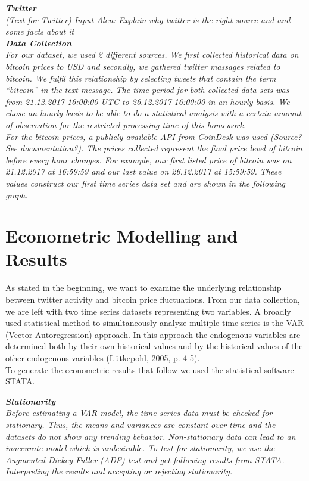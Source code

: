 \documentclass[a4paper,american,12pt]{article}
\begin{document}
\begin{spacing}{1.2}
		\itshape\textbf {Twitter}\\
		\textnormal {(Text for Twitter) Input Alen: Explain why twitter is the right source and and some facts about it}\\
		
		\itshape\textbf {Data Collection}\\
		\textnormal {For our dataset, we used 2 different sources. We first collected historical data on bitcoin prices to USD and secondly, we gathered twitter massages related to bitcoin. We fulfil this relationship by selecting tweets that contain the term “bitcoin” in the text message. The time period for both collected data sets was from 21.12.2017 16:00:00 UTC to 26.12.2017 16:00:00 in an hourly basis. We chose an hourly basis to be able to do a statistical analysis with a certain amount of observation for the restricted processing time of this homework.\\
For the bitcoin prices, a publicly available API from CoinDesk was used (Source? See documentation?). The prices collected represent the final price level of bitcoin before every hour changes. For example, our first listed price of bitcoin was on 21.12.2017 at 16:59:59 and our last value on 26.12.2017 at 15:59:59. These values construct our first time series data set and are shown in the following graph.\\}
				
		\clearpage
		
		\section{Econometric Modelling and Results}
		\textnormal {As stated in the beginning, we want to examine the underlying relationship between twitter activity and bitcoin price fluctuations. From our data collection, we are left with two time series datasets representing two variables. A broadly used statistical method to simultaneously analyze multiple time series is the VAR (Vector Autoregression) approach. In this approach the endogenous variables are determined both by their own historical values and by the historical values of the other endogenous variables (Lütkepohl, 2005, p. 4-5).\\
To generate the econometric results that follow we used the statistical software STATA.}

		\itshape\textbf {Stationarity}\\
		\textnormal {Before estimating a VAR model, the time series data must be checked for stationary. Thus, the means and variances are constant over time and the datasets do not show any trending behavior. Non-stationary data can lead to an inaccurate model which is undesirable. To test for stationarity, we use the Augmented Dickey-Fuller (ADF) test and get following results from STATA.\\
Interpreting the results and accepting or rejecting stationarity.}


\end{spacing}
\end{document}
